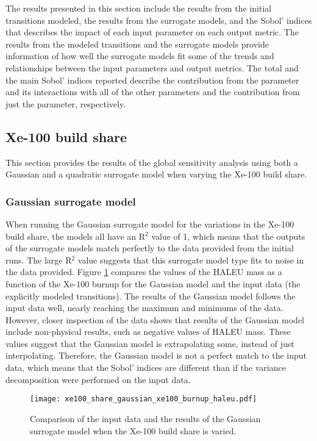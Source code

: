 The results presented in this section include the results from the initial 
transitions modeled, the results from the surrogate models, and the Sobol' indices 
that describes the impact of each input parameter on each output metric. The 
results from the modeled transitions and the surrogate models provide 
information of how well the surrogate models fit some of the trends and relationships 
between the input parameters and output metrics. 
The total and the main Sobol' indices reported describe the contribution from the 
parameter 
and its interactions with all of the other parameters and the contribution from 
just the parameter, respectively. 

\subsection{Xe-100 build share}
This section provides the results of the global sensitivity analysis using 
both a Gaussian and a quadratic surrogate model when varying the Xe-100 build 
share. 

\subsubsection{Gaussian surrogate model}
When running the Gaussian surrogate model for the variations in the Xe-100 build 
share, the models all  have an R$^2$ value of 1, which means that the outputs of 
the surrogate models match perfectly to the data provided from the initial 
\Cyclus runs. The large R$^2$ value suggests that this surrogate model type 
fits to noise in the data provided. 
Figure \ref{fig:s7_xe100_gaussian} compares the values of the
\gls{HALEU} mass as a function of the Xe-100 burnup for the Gaussian model 
and the input data (the explicitly modeled transitions). The results of 
the Gaussian model follows the input 
data well, nearly reaching the maximum and minimums of the data. However, 
closer inspection of the data shows that results of the Gaussian model 
include non-physical results, such as negative values of \gls{HALEU} mass. 
These values suggest that the Gaussian model is extrapolating some, instead 
of just interpolating. Therefore, the Gaussian model is not a perfect 
match to the input data, which means that the Sobol' indices are different 
than if the variance decomposition were performed on the input data. 

\begin{figure}
    \centering 
    \texttt{[image: xe100\_share\_gaussian\_xe100\_burnup\_haleu.pdf]}
    \caption{Comparison of the input data and the results of the Gaussian 
    surrogate model when the Xe-100 build share is varied.}
    \label{fig:s7_xe100_gaussian}
\end{figure}

